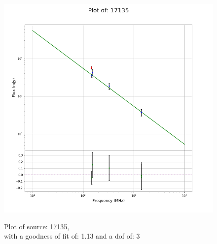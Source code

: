 \documentclass{article}
\begin{document}
\begin{figure}[H]
\begin{minipage}{0.5\textwidth}
        \includegraphics[scale = 0.35]{KmeulenTrap4P23_1min/1min17135.png}
        \captionsetup{labelformat=empty}
        \caption{Plot of source: \href{http://banana.transientskp.org/r4/vlo_KmeulenTrap4P23/runningcatalog/17135}{17135},\\with a goodness of fit of: 1.13 and a dof of: 3}
    \addtocounter{figure}{-1}
    \label{KmeulenTrap4P23:1min:17135:plot}
    \end{minipage}
\end{figure}
\end{document}
